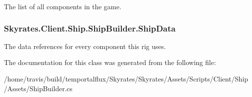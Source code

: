 The list of all components in the game. 

\hypertarget{class_skyrates_1_1_client_1_1_ship_1_1_ship_builder_a14ff4eece1ec5d9bab63c8449939305c}{
\subsubsection[{Ship\-Data}]{ Skyrates.\-Client.\-Ship.\-Ship\-Builder.\-Ship\-Data}}\label{class_skyrates_1_1_client_1_1_ship_1_1_ship_builder_a14ff4eece1ec5d9bab63c8449939305c}


The data references for every component this rig uses. 



The documentation for this class was generated from the following file\-:\begin{DoxyCompactItemize}
\item 
/home/travis/build/temportalflux/\-Skyrates/\-Skyrates/\-Assets/\-Scripts/\-Client/\-Ship/\-Assets/Ship\-Builder.\-cs\end{DoxyCompactItemize}
